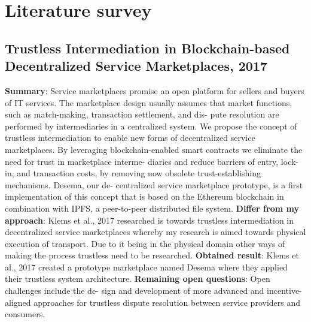 \documentclass[11pt]{article}
\begin{document}
\section{Literature survey}

\subsection{Trustless Intermediation in Blockchain-based Decentralized Service Marketplaces, 2017 \cite{trustlessIntermediationInBCServiceMarket}}
\textbf{Summary}: Service marketplaces promise an open platform for sellers and buyers of IT services. The marketplace design usually assumes that market functions, such as match-making, transaction settlement, and dis- pute resolution are performed by intermediaries in a centralized system. We propose the concept of trustless intermediation to enable new forms of decentralized service marketplaces. By leveraging blockchain-enabled smart contracts we eliminate the need for trust in marketplace interme- diaries and reduce barriers of entry, lock-in, and transaction costs, by removing now obsolete trust-establishing mechanisms. Desema, our de- centralized service marketplace prototype, is a first implementation of this concept that is based on the Ethereum blockchain in combination with IPFS, a peer-to-peer distributed file system.\newline
\textbf{Differ from my approach}: Klems et al., 2017 researched is towards trustless intermediation in decentralized service marketplaces whereby my research is aimed towards physical execution of transport. Due to it being in the physical domain other ways of making the process trustless need to be researched.\newline
\textbf{Obtained result}: Klems et al., 2017 created a prototype marketplace named Desema where they applied their trustless system architecture. \newline
\textbf{Remaining open questions}: Open challenges include the de- sign and development of more advanced and incentive-aligned approaches for trustless dispute resolution between service providers and consumers.\newline
\end{document}
